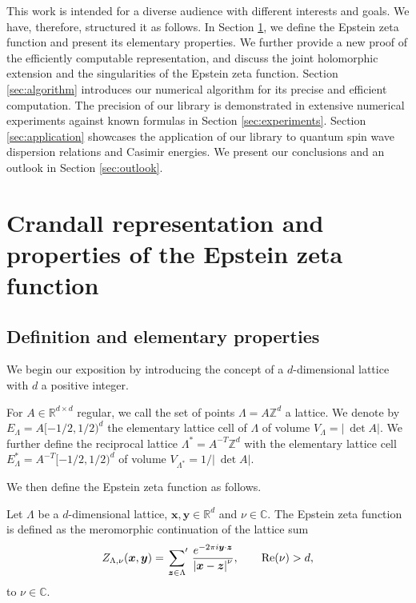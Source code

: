 \documentclass[]{amsart}
\newcommand{\new}[1]{#1}
\newcommand{\zeps}[3]{\new{Z_{#1} (#2, #3)}}
\newcommand{\sums}{\sideset{}{'} \sum}
\numberwithin{mythm}{section}
\begin{document}
This work is intended for a diverse audience with different interests and goals. We have, therefore, structured it as follows.
In Section \ref{sec:crandall}, we define the Epstein zeta function 
and present its elementary properties. We further provide a new proof of the efficiently computable representation, and discuss the joint \new{holomorphic extension} and the singularities of the Epstein zeta function.
Section \ref{sec:algorithm} introduces our numerical algorithm for its precise and efficient computation.
The precision of our library is demonstrated in extensive numerical experiments against known formulas in Section \ref{sec:experiments}. 
Section \ref{sec:application} showcases the application of our library to quantum spin wave dispersion relations and Casimir energies. We present our conclusions and an outlook in Section \ref{sec:outlook}.

\section{Crandall representation and properties of the Epstein zeta function}
\label{sec:crandall}


\subsection{Definition and elementary properties}
We begin our exposition by introducing the concept of a $d$-dimensional lattice with $d$ a positive integer.

\begin{definition}[Lattices]
For \(A\in\mathds{R}^{d\times d}\) regular, we call the set of points \(\Lambda = A\mathds{Z}^{d}\) a lattice. 
We denote by $E_{\Lambda}=A[-1/2,1/2)^d$
the elementary lattice cell
of \(\Lambda\)
of volume \(V_{\Lambda}=|\:\!\!\det A|\).
We further define the reciprocal lattice \(\Lambda^{\ast}=A^{-T}\mathds{Z}^{d}\)
with the
elementary lattice cell $E_{\Lambda}^{\ast}=A^{-T}[-1/2,1/2)^d$
of volume
\(V_{\Lambda^{\ast}}=1/|\:\!\!\det A|\).
\end{definition}
We then define the Epstein zeta function as follows.
\begin{definition}
\label{epsteindef}
Let $\Lambda$ be a $d$-dimensional lattice, $\bm x, \bm y \in \mathds{R}^d$ and $\nu \in \mathds{C}$.
The Epstein zeta function is defined as the meromorphic continuation of the lattice sum
\[
		\zeps{\Lambda,\nu}{\bm x}{\bm y} = \sums_{\bm z \in \Lambda} \, \frac{e^{-2\pi i \bm y \cdot \bm z}}{\left|\bm x- \bm z\right|^\nu},\qquad \mathrm{Re}(\nu)>d,
\]
 to \(\nu\in\mathds C\).
  \end{definition}
\end{document}
